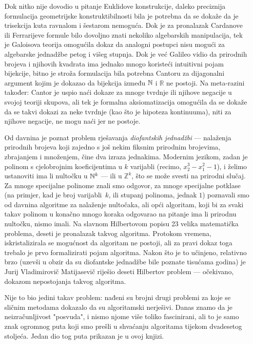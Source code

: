 Dok nitko nije dovodio u pitanje Euklidove konstrukcije, daleko preciznija formulacija geometrijske konstruktibilnosti bila je potrebna da se dokaže da je trisekcija kuta ravnalom i šestarom nemoguća. Dok je za pronalazak Cardanove ili Ferrarijeve formule bilo dovoljno znati nekoliko algebarskih manipulacija, tek je Galoisova teorija omogućila dokaz da analogni postupci nisu mogući za algebarske jednadžbe petog i višeg stupnja. Dok je već Galileo vidio da prirodnih brojeva i njihovih kvadrata ima jednako mnogo koristeći intuitivni pojam bijekcije, bitno je stroža formulacija bila potrebna Cantoru za dijagonalni argument kojim je dokazao da bijekcija između ${\mathbb N}$ i $\mathbb R$ ne postoji. Na meta-razini također: Cantor je uspio naći dokaze za mnoge tvrdnje ili njihove negacije u svojoj teoriji skupova, ali tek je formalna aksiomatizacija omogućila da se dokaže da se takvi dokazi za neke tvrdnje (kao što je hipoteza kontinuuma), niti za njihove negacije, ne mogu naći jer ne postoje.

Od davnina je poznat problem rješavanja \emph{diofantskih jednadžbi} --- nalaženja prirodnih brojeva koji zajedno s još nekim fiksnim prirodnim brojevima, zbrajanjem i množenjem, čine dva izraza jednakima. Modernim jezikom, zadan je polinom s cjelobrojnim koeficijentima u $k$ varijabli (recimo, $x_2^3-x_1^2-1$), i želimo ustanoviti ima li nultočku u ${\mathbb N}^k$ --- ili u $\mathbb Z^k$, što se može svesti na prirodni slučaj. Za mnoge specijalne polinome znali smo odgovor, za mnoge specijalne potklase (na primjer, kad je broj varijabli~$k$, ili stupanj polinoma, jednak $1$) poznavali smo od davnina algoritme za nalaženje nultočaka, ali opći algoritam, koji bi za svaki takav polinom u konačno mnogo koraka odgovarao na pitanje ima li prirodnu nultočku, nismo imali. Na slavnom Hilbertovom popisu 23 velika matematička problema, deseti je pronalazak takvog algoritma. Protokom vremena, iskristalizirala se mogućnost da algoritam ne postoji, ali za pravi dokaz toga trebalo je prvo formalizirati pojam algoritma. Nakon što je to učinjeno, relativno brzo (uzevši u obzir da su diofantske jednadžbe bile poznate tisućama godina) je Jurij Vladimirovič Matijasevič riješio deseti Hilbertov problem --- očekivano, dokazom nepostojanja takvog algoritma.

Nije to bio jedini takav problem: nađeni su brojni drugi problemi za koje se sličnim metodama dokazalo da su algoritamski nerješivi. Danas znamo da je neizračunljivost "posvuda", i nismo njome više toliko fascinirani, ali to je samo znak ogromnog puta koji smo prešli u shvaćanju algoritama tijekom dvadesetog stoljeća. Jedan dio tog puta prikazan je u ovoj knjizi.

